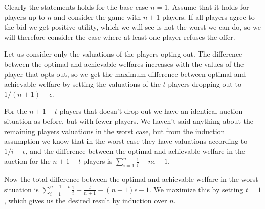 Clearly the statements holds for the base case $n=1$. Assume that it holds for players up to $n$ and consider the game with $n+1$ players. If all players agree to the bid we get positive utility, which we will see is not the worst we can do, so we will therefore consider the case where at least one player refuses the offer.

Let us consider only the valuations of the players opting out. The difference between the optimal and achievable welfares increases with the values of the player that opts out, so we get the maximum difference between optimal and achievable welfare by setting the valuations of the $t$ players dropping out to $1/(n+1)- \epsilon$. 

For the $n+1-t$ players that doesn't drop out we have an identical auction situation as before, but with fewer players. We haven't said anything about the remaining players valuations in the worst case, but from the induction assumption we know that in the worst case they have valuations according to $1/i - \epsilon$, and the difference between the optimal and achievable welfare in the auction for the $n+1-t$ players is $\sum_{i=1}^n \frac{1}{i} - n \epsilon - 1$.

Now the total difference between the optimal and achievable welfare in the worst situation is $\sum_{i=1}^{n+1-t} \frac{1}{i} + \frac{t}{n+1} - (n+1) \epsilon - 1$. We maximize this by setting $t=1$, which gives us the desired result by induction over $n$.

